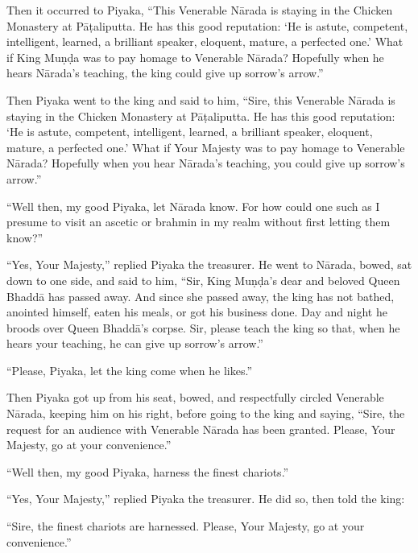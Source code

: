 \documentclass[12pt,openany]{book}%
\begin{document}
Then it occurred to Piyaka, “This Venerable \textsanskrit{Nārada} is staying in the Chicken Monastery at \textsanskrit{Pāṭaliputta}. He has this good reputation: ‘He is astute, competent, intelligent, learned, a brilliant speaker, eloquent, mature, a perfected one.’ What if King \textsanskrit{Muṇḍa} was to pay homage to Venerable \textsanskrit{Nārada}? Hopefully when he hears \textsanskrit{Nārada}’s teaching, the king could give up sorrow’s arrow.” 

Then Piyaka went to the king and said to him, “Sire, this Venerable \textsanskrit{Nārada} is staying in the Chicken Monastery at \textsanskrit{Pāṭaliputta}. He has this good reputation: ‘He is astute, competent, intelligent, learned, a brilliant speaker, eloquent, mature, a perfected one.’ What if Your Majesty was to pay homage to Venerable \textsanskrit{Nārada}? Hopefully when you hear \textsanskrit{Nārada}’s teaching, you could give up sorrow’s arrow.” 

“Well then, my good Piyaka, let \textsanskrit{Nārada} know. For how could one such as I presume to visit an ascetic or brahmin in my realm without first letting them know?” 

“Yes, Your Majesty,” replied Piyaka the treasurer. He went to \textsanskrit{Nārada}, bowed, sat down to one side, and said to him, “Sir, King \textsanskrit{Muṇḍa}’s dear and beloved Queen \textsanskrit{Bhaddā} has passed away. And since she passed away, the king has not bathed, anointed himself, eaten his meals, or got his business done. Day and night he broods over Queen \textsanskrit{Bhaddā}’s corpse. Sir, please teach the king so that, when he hears your teaching, he can give up sorrow’s arrow.” 

“Please, Piyaka, let the king come when he likes.” 

Then Piyaka got up from his seat, bowed, and respectfully circled Venerable \textsanskrit{Nārada}, keeping him on his right, before going to the king and saying, “Sire, the request for an audience with Venerable \textsanskrit{Nārada} has been granted. Please, Your Majesty, go at your convenience.” 

“Well then, my good Piyaka, harness the finest chariots.” 

“Yes, Your Majesty,” replied Piyaka the treasurer. He did so, then told the king: 

“Sire, the finest chariots are harnessed. Please, Your Majesty, go at your convenience.” 
\end{document}
